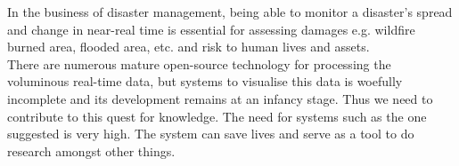 In the business of disaster management, being able to monitor a disaster's spread and change in near-real time is essential for assessing damages e.g. wildfire burned area, flooded area, etc. and risk to human lives and assets.\\
There are numerous mature open-source technology for processing the voluminous real-time data, but systems to visualise this data is woefully incomplete and its development remains at an infancy stage. Thus we need to contribute to this quest for knowledge. The need for systems such as the one suggested is very high. The system can save lives and serve as a tool to do research amongst other things.
